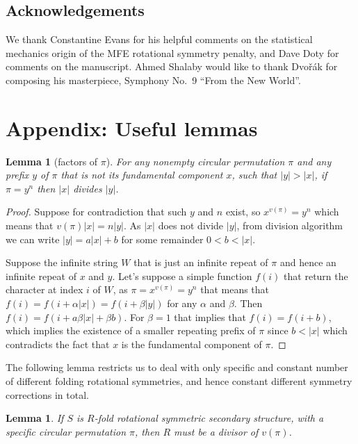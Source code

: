 \documentclass[11pt,letterpaper]{article}  \usepackage[margin=1in]{geometry}
\newtheorem{lemma}[theorem]{Lemma}
\theoremstyle{definition}  \newtheorem{Definition}[theorem]{Definition}
\begin{document}
 	
	\subsection*{Acknowledgements} 
	We thank Constantine Evans for his helpful comments on the statistical mechanics origin of the MFE rotational symmetry penalty, and Dave Doty for comments on the manuscript. Ahmed Shalaby would like to thank Dvořák for composing his masterpiece, Symphony No.~9 ``From the New World''. 
	
	   
	
	
	\newpage
	\appendix
	\section{Appendix: Useful lemmas}\label{sec:lemmasApp}
\begin{lemma}[factors of $\pi$]\label{lem:factors}
	For any nonempty circular permutation $\pi$ 
	and any prefix $y$ of $\pi$ that is not its fundamental component $x$, 
	such that $|y|>|x|$, 
	if $\pi = y^n$ then $|x|$ divides $|y|$.    
\end{lemma}
\begin{proof}
	Suppose for contradiction that such $y$ and $n$ exist, so $x^{v(\pi)} = y^n$ which means that $v(\pi)|x| = n|y|$. As $|x|$ does not divide $|y|$, from division algorithm we can write $|y| = a |x| + b$ for some remainder $0<b<|x|$.
	
	Suppose the infinite string $W$ that is just an infinite repeat of $\pi$ and hence an infinite repeat of $x$ and $y$. Let's suppose a simple function $f(i)$ that return the character at index $i$ of $W$, as $\pi = x^{v(\pi)} = y^n$ that means that $f(i) = f(i+\alpha|x|) = f(i+\beta|y|)$ for any $\alpha$ and $\beta$. Then $f(i) = f(i+ a\beta |x| + \beta b)$. For $\beta = 1$ that implies that $f(i) = f(i+b)$, which implies the  existence of a smaller repeating prefix of $\pi$ since $b<|x|$ which contradicts the fact that $x$ is the fundamental component of $\pi$.   
\end{proof}


The following lemma restricts us to deal with only specific and constant number of different folding rotational symmetries, and hence constant different symmetry corrections in total. 
\begin{lemma}\label{lem:div}
	If $S$ is $R$-fold rotational symmetric secondary structure, with a specific circular permutation $\pi$, then $R$ must be a divisor of $v(\pi)$.
\end{lemma}
\end{document}
